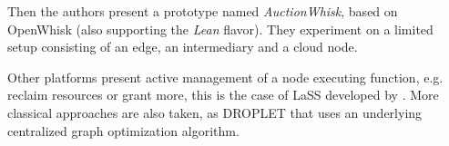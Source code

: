 \documentclass[11pt]{sdm}
\begin{document}
\begin{description}
		Then the authors present a prototype named \emph{AuctionWhisk}, based on OpenWhisk (also supporting the \emph{Lean} flavor). They experiment on a limited setup consisting of an edge, an intermediary and a cloud node.


\end{description}

Other platforms present active management of a node executing function, e.g. reclaim resources or grant more, this is the case of \gls{LaSS} developed by \citet{wang_lass_2021}. More classical approaches are also taken, as  DROPLET that uses an underlying centralized graph optimization algorithm.







\end{document}
